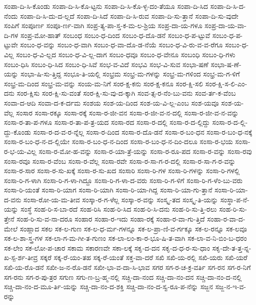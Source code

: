 {ಸಂಪಾ-ದಿ-ಸಿ-ಕೊಂಡು
ಸಂಪಾ-ದಿ-ಸಿ-ಕೊ-ಟ್ಟನು
ಸಂಪಾ-ದಿ-ಸಿ-ಕೊ-ಳ್ಳ-ದಂ-ತೆಯೂ
ಸಂಪಾ-ದಿ-ಸಿದ
ಸಂಪಾ-ದಿ-ಸಿ-ದ-ನೆಂದು
ಸಂಪಾ-ದಿ-ಸಿ-ದು-ದ-ಲ್ಲದೆ
ಸಂಪಾ-ದಿ-ಸಿದೆ
ಸಂಪಾ-ದಿ-ಸಿ-ರುವ
ಸಂಪಾ-ದಿ-ಸು-ತ್ತಾನೆ
ಸಂಪಾ-ದಿ-ಸು-ವುದೇ
ಸಂಪಿಗೆ
ಸಂಪೂರ್ಣ
ಸಂಪೂ-ರ್ಣ-ವಾಗಿ
ಸಂಪ್ರ-ತ್ಯ-ಪಾ-ಸ್ತ-ಕ-ಮ-ಲ-ಶ್ರಿಯ
ಸಂಪ್ರ-ದಾ-ಯ-ಗಳೂ
ಸಂಪ್ರ-ದಾ-ಯ-ವಾ-ದಿ-ಗಳ
ಸಂಪ್ರ-ಮೋ-ಹಾತ್
ಸಂಬಂಧ
ಸಂಬಂ-ಧ-ದಿಂದ
ಸಂಬಂ-ಧ-ದೊ-ಡನೆ
ಸಂಬಂ-ಧ-ಪ-ಟ್ಟುವೆ
ಸಂಬಂ-ಧ-ಪ-ಟ್ಟುವೇ
ಸಂಬಂ-ಧ-ವನ್ನು
ಸಂಬಂ-ಧ-ವಾಗಿ
ಸಂಬಂ-ಧ-ವಾ-ದೊ-ಡ-ನೆಯೆ
ಸಂಬಂ-ಧ-ವಿ-ರು-ವ-ವ-ರೆಗೂ
ಸಂಬಂ-ಧ-ವಿಲ್ಲ
ಸಂಬಂ-ಧ-ವಿ-ಲ್ಲದ
ಸಂಬಂ-ಧ-ವಿ-ಲ್ಲ-ದಾಗ
ಸಂಬಂ-ಧವೂ
ಸಂಬಂ-ಧ-ವೇನೂ
ಸಂಬಂಧಿ
ಸಂಬಂ-ಧಿ-ಗಳು
ಸಂಬಂ-ಧಿಸಿ
ಸಂಬಂ-ಧಿ-ಸಿದ
ಸಂಬಂ-ಧಿ-ಸಿವೆ
ಸಂಭ-ವ-ವಿದೆ
ಸಂಭವಿ
ಸಂಭ-ವಿ-ಸುವ
ಸಂಭಾ-ಷಣೆ
ಸಂಭಾ-ಷ-ಣೆ-ಯನ್ನು
ಸಂಭಾ-ಷಿ-ಸು-ತ್ತಿದ್ದ
ಸಂಭೂ-ತಿ-ಯಲ್ಲಿ
ಸಂಭ್ರಮ
ಸಂಭ್ರ-ಮ-ಗಳನ್ನು
ಸಂಭ್ರ-ಮ-ಗಳಿಂದ
ಸಂಭ್ರ-ಮ-ಗ-ಳಿಗೆ
ಸಂಭ್ರ-ಮ-ದಿಂದ
ಸಂಭ್ರ-ಮ-ವನ್ನು
ಸಂಯ-ಮ-ನಿಗೆ
ಸಂರ-ಕ್ಷ-ಕನು
ಸಂರ-ಕ್ಷ-ಕನೂ
ಸಂರ-ಕ್ಷಿ-ಸಲಿ
ಸಂರ-ಕ್ಷಿ-ಸ-ಲಿ-ಎಂ-ದನು
ಸಂರ-ಕ್ಷಿಸು
ಸಂರ-ಕ್ಷಿ-ಸು-ವಂತೆ
ಸಂರ-ಕ್ಷಿ-ಸು-ವು-ದ-ಕ್ಕಾಗಿ
ಸಂವ-ತ್ಸ-ರ-ನೆಂ-ಬು-ವನು
ಸಂವ-ರ್ತ-ಕ-ವೆಂಬ
ಸಂವಾ-ದ-ಆದಿ
ಸಂವಾ-ದ-ಕ-ರ್ದಮ
ಸಂಶಯ
ಸಂಶ-ಯ-ದಿಂದ
ಸಂಶ-ಯ-ವಿ-ಲ್ಲ-ಎಂಬ
ಸಂಶ-ಯವೂ
ಸಂಶ-ಯ-ವೆಲ್ಲ
ಸಂಸಾರ
ಸಂಸಾ-ರಕ್ಕೂ
ಸಂಸಾ-ರಕ್ಕೆ
ಸಂಸಾ-ರ-ಜೀ-ವನ
ಸಂಸಾ-ರ-ಜೀ-ವ-ನ-ದಲ್ಲಿ
ಸಂಸಾ-ರ-ಜೀ-ವ-ನ-ವನ್ನು
ಸಂಸಾ-ರ-ತಾ-ಪ-ಗಳೂ
ಸಂಸಾ-ರ-ತಾ-ಪ-ತ್ರ-ಯದ
ಸಂಸಾ-ರದ
ಸಂಸಾ-ರ-ದಲ್ಲಿ
ಸಂಸಾ-ರ-ದ-ಲ್ಲಿದ್ದು
ಸಂಸಾ-ರ-ದ-ಲ್ಲಿ-ದ್ದು-ಕೊಂಡು
ಸಂಸಾ-ರ-ದ-ವ-ರ-ನ್ನೆಲ್ಲ
ಸಂಸಾ-ರ-ದಿಂದ
ಸಂಸಾ-ರ-ದೊ-ಡನೆ
ಸಂಸಾ-ರ-ಬಂ-ಧನ
ಸಂಸಾ-ರ-ಬಂ-ಧ-ನಕ್ಕೆ
ಸಂಸಾ-ರ-ಬಂ-ಧ-ನ-ದ-ಲ್ಲಿಯೇ
ಸಂಸಾ-ರ-ಬಂ-ಧ-ನ-ದಿಂದ
ಸಂಸಾ-ರ-ಬಂ-ಧ-ನ-ದಿಂ-ದಲೂ
ಸಂಸಾ-ರ-ಭಯ
ಸಂಸಾ-ರ-ಭ-ಯ-ವಿಲ್ಲ
ಸಂಸಾ-ರ-ಮೋ-ಹ-ವನ್ನು
ಸಂಸಾ-ರ-ಯಾ-ತ್ರೆ-ಯನ್ನು
ಸಂಸಾ-ರ-ರೂ-ಪದ
ಸಂಸಾ-ರ-ವನ್ನು
ಸಂಸಾ-ರವು
ಸಂಸಾ-ರವೂ
ಸಂಸಾ-ರ-ವೆಂಬ
ಸಂಸಾ-ರ-ವೆಲ್ಲ
ಸಂಸಾ-ರವೇ
ಸಂಸಾ-ರ-ಸಾ-ಗ-ರ-ದಲ್ಲಿ
ಸಂಸಾ-ರ-ಸಾ-ಗ-ರ-ವನ್ನು
ಸಂಸಾ-ರ-ಸಾರ
ಸಂಸಾ-ರ-ಸು-ಖಕ್ಕೆ
ಸಂಸಾ-ರ-ಸು-ಖದ
ಸಂಸಾರಿ
ಸಂಸಾ-ರಿ-ಗಳ
ಸಂಸಾ-ರಿ-ಗಳನ್ನು
ಸಂಸಾ-ರಿ-ಗಳಲ್ಲಿ
ಸಂಸಾ-ರಿ-ಗ-ಳಾಗಿ
ಸಂಸಾ-ರಿ-ಗ-ಳಾ-ಗಿದ್ದೂ
ಸಂಸಾ-ರಿ-ಗ-ಳಾ-ದ-ವರು
ಸಂಸಾ-ರಿ-ಗ-ಳಿಗೆ
ಸಂಸಾ-ರಿ-ಗ-ಳೆಂ-ಬು-ವರು
ಸಂಸಾ-ರಿ-ಯಂತೆ
ಸಂಸಾ-ರಿ-ಯಾಗ
ಸಂಸಾ-ರಿ-ಯಾಗಿ
ಸಂಸಾ-ರಿ-ಯಾ-ಗಿದ್ದ
ಸಂಸಾ-ರಿ-ಯಾ-ಗು-ತ್ತಾನೆ
ಸಂಸಾ-ರಿ-ಯಾ-ದ-ವನು
ಸಂಸಾ-ರೋ-ಯ-ಮ-ತೀವ
ಸಂಸ್ಕಾ-ರ-ಗ-ಳೆಲ್ಲ
ಸಂಸ್ಕಾ-ರ-ವನ್ನು
ಸಂಸ್ಕೃ-ತದ
ಸಂಸ್ಕೃ-ತಿ-ಯನ್ನು
ಸಂಸ್ಥಾ-ಪ-ನೆ-ಯನ್ನು
ಸಂಸ್ಥೆ
ಸಂಹ-ರಿ-ಸ-ಬಾ-ರದೆ
ಸಂಹ-ರಿಸಿ
ಸಂಹ-ರಿ-ಸಿದ
ಸಂಹ-ರಿ-ಸಿ-ದನು
ಸಂಹ-ರಿ-ಸು-ತ್ತಿ-ರಲು
ಸಂಹ-ರಿ-ಸು-ತ್ತೇನೆ
ಸಂಹ-ರಿ-ಸು-ವ-ನಾ-ದರೂ
ಸಂಹಾರ
ಸಂಹಾ-ರ-ಇದು
ಸಂಹಾ-ರಕ್ಕೆ
ಸಂಹಾ-ರ-ವಾ-ಗು-ತ್ತಿದೆ
ಸಂಹಾ-ರ-ವಾ-ದ-ಮೇಲೆ
ಸಂಹ್ಲಾದ
ಸಕಲ
ಸಕ-ಲ-ಗುಣ
ಸಕ-ಲ-ಧ-ರ್ಮ-ಗಳನ್ನೂ
ಸಕ-ಲ-ಪ್ರಾ-ಣಿ-ವ-ರ್ಗಕ್ಕೂ
ಸಕ-ಲ-ರನ್ನೂ
ಸಕ-ಲವೂ
ಸಕ-ಲ-ಶಾ-ಸ್ತ್ರ-ಗಳ
ಸಕ-ಲಾ-ಗ-ಮ-ಗೀ-ತ-ಗುಣಂ
ಸಕ-ಲಾ-ಲಂ-ಕಾ-ರ-ಭೂ-ಷಿ-ತ-ವಾಗಿ
ಸಕ-ಲಾ-ವ-ನಿ-ಬಿಂ-ಬ-ಧರಂ
ಸಕ-ಲೇಂ
ಸಕ-ಲೋ-ಪ-ಚಾರ
ಸಕಾಮ
ಸಕಾರಣವೇ
ಸಕಾ-ಲಕ್ಕೆ
ಸಕೃ-ದ-ದನ
ಸಕೃ-ದ-ಧ-ರ-ಸು-ಧಾಂ
ಸಕೃ-ದೇ-ತ-ತ್ತ-ನ್ನ-ಖ-ಸ್ಪ-ರ್ಶ-ತೀವ್ರ
ಸಕ್ಕರೆ
ಸಕ್ಕ-ರೆ-ಯಂ-ತಹ
ಸಕ್ಕ-ರೆ-ಯಂತೆ
ಸಕ್ತ-ವಾ-ದರೆ
ಸಖಿ
ಸಖಿ-ಯ-ರಲ್ಲಿ
ಸಖಿ-ಯರು
ಸಖಿ-ಯರೆ
ಸಖಿ-ಯ-ರೊ-ಡನೆ
ಸಖೀ-ಜ-ನ-ರೊ-ಡನೆ
ಸಖೀ-ಭಾ-ವ-ದಾ-ಸಿ-ಭಾವ
ಸಗರ
ಸಗ-ರ-ಚ-ಕ್ರ-ವರ್ತಿ
ಸಗ-ರನ
ಸಗ-ರ-ನಿಗೆ
ಸಗ-ರನು
ಸಗ-ರ-ಪು-ತ್ರರ
ಸಗುಣ
ಸಗು-ಣ-ಬ್ರ-ಹ್ಮ-ನಲ್ಲಿ
ಸಚ್ಚಿ-ದಾ-ನಂದ
ಸಚ್ಚಿ-ದಾ-ನಂ-ದನ
ಸಚ್ಚಿ-ದಾ-ನಂ-ದ-ನಲ್ಲಿ
ಸಚ್ಚಿ-ದಾ-ನಂ-ದ-ಮೂ-ರ್ತಿ-ಯನ್ನು
ಸಚ್ಚಿ-ದಾ-ನಂ-ದ-ಶಕ್ತಿ
ಸಚ್ಚಿ-ದಾ-ನಂ-ದ-ಸ್ವ-ರೂ-ಪ-ನೆನ್ನು
ಸಜ್ಜನ
ಸಜ್ಜ-ನ-ಇ-ವ-ರನ್ನು
}
